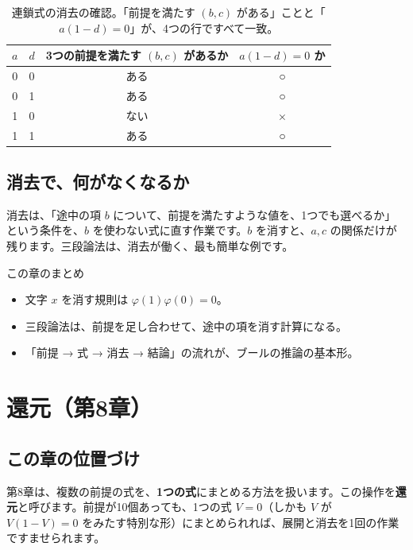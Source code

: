 \documentclass[a4paper,11pt,openany]{ltjsbook}
\begin{document}
\begin{table}[htbp]
\centering
\begin{tabular}{cc|cc}
\toprule
$a$ & $d$ & 3つの前提を満たす $(b,c)$ があるか & $a(1-d)=0$ か\\
\midrule
0 & 0 & ある & ○\\
0 & 1 & ある & ○\\
1 & 0 & ない & ×\\
1 & 1 & ある & ○\\
\bottomrule
\end{tabular}
\caption{連鎖式の消去の確認。「前提を満たす $(b,c)$ がある」ことと「$a(1-d)=0$」が、4つの行ですべて一致。}
\end{table}

\section{消去で、何がなくなるか}

消去は、「途中の項 $b$ について、前提を満たすような値を、1つでも選べるか」という条件を、$b$ を使わない式に直す作業です。$b$ を消すと、$a,c$ の関係だけが残ります。三段論法は、消去が働く、最も簡単な例です。

\begin{pointbox}{この章のまとめ}
\begin{itemize}[leftmargin=*]
\item 文字 $x$ を消す規則は $\varphi(1)\varphi(0)=0$。
\item 三段論法は、前提を足し合わせて、途中の項を消す計算になる。
\item 「前提 → 式 → 消去 → 結論」の流れが、ブールの推論の基本形。
\end{itemize}
\end{pointbox}

\chapter{還元（第8章）}

\section{この章の位置づけ}

第8章は、複数の前提の式を、\textbf{1つの式}にまとめる方法を扱います。この操作を\textbf{還元}と呼びます。前提が10個あっても、1つの式 $V=0$（しかも $V$ が $V(1-V)=0$ をみたす特別な形）にまとめられれば、展開と消去を1回の作業ですませられます。
\end{document}
